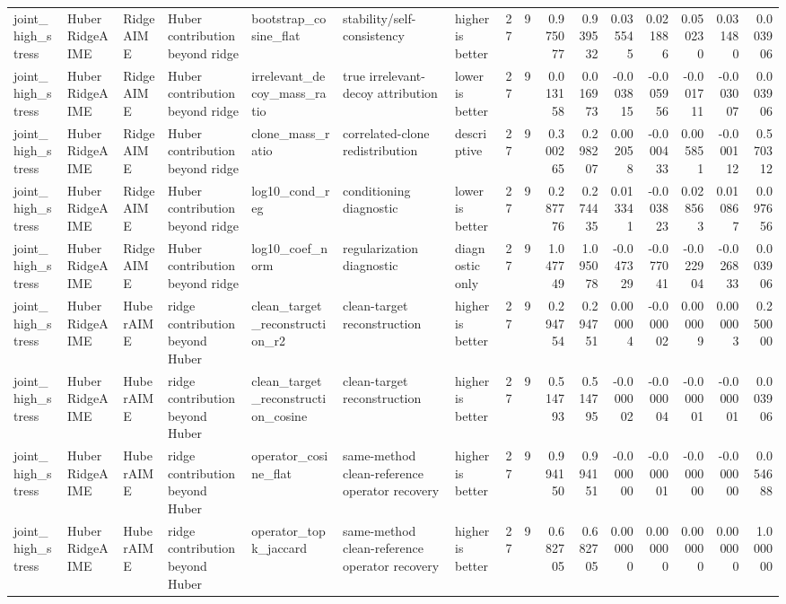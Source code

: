 \begin{table}[t]
\begin{tabular}{lllllllrrrrrrrrr}
joint_high_stress & HuberRidgeAIME & RidgeAIME & Huber contribution beyond ridge & bootstrap_cosine_flat & stability/self-consistency & higher is better & 27 & 9 & 0.975077 & 0.939532 & 0.035545 & 0.021886 & 0.050230 & 0.031480 & 0.003906 \\
joint_high_stress & HuberRidgeAIME & RidgeAIME & Huber contribution beyond ridge & irrelevant_decoy_mass_ratio & true irrelevant-decoy attribution & lower is better & 27 & 9 & 0.013158 & 0.016973 & -0.003815 & -0.005956 & -0.001711 & -0.003007 & 0.003906 \\
joint_high_stress & HuberRidgeAIME & RidgeAIME & Huber contribution beyond ridge & clone_mass_ratio & correlated-clone redistribution & descriptive & 27 & 9 & 0.300265 & 0.298207 & 0.002058 & -0.000433 & 0.005851 & -0.000112 & 0.570312 \\
joint_high_stress & HuberRidgeAIME & RidgeAIME & Huber contribution beyond ridge & log10_cond_reg & conditioning diagnostic & lower is better & 27 & 9 & 0.287776 & 0.274435 & 0.013341 & -0.003823 & 0.028563 & 0.010867 & 0.097656 \\
joint_high_stress & HuberRidgeAIME & RidgeAIME & Huber contribution beyond ridge & log10_coef_norm & regularization diagnostic & diagnostic only & 27 & 9 & 1.047749 & 1.095078 & -0.047329 & -0.077041 & -0.022904 & -0.026833 & 0.003906 \\
joint_high_stress & HuberRidgeAIME & HuberAIME & ridge contribution beyond Huber & clean_target_reconstruction_r2 & clean-target reconstruction & higher is better & 27 & 9 & 0.294754 & 0.294751 & 0.000004 & -0.000002 & 0.000009 & 0.000003 & 0.250000 \\
joint_high_stress & HuberRidgeAIME & HuberAIME & ridge contribution beyond Huber & clean_target_reconstruction_cosine & clean-target reconstruction & higher is better & 27 & 9 & 0.514793 & 0.514795 & -0.000002 & -0.000004 & -0.000001 & -0.000001 & 0.003906 \\
joint_high_stress & HuberRidgeAIME & HuberAIME & ridge contribution beyond Huber & operator_cosine_flat & same-method clean-reference operator recovery & higher is better & 27 & 9 & 0.994150 & 0.994151 & -0.000000 & -0.000001 & -0.000000 & -0.000000 & 0.054688 \\
joint_high_stress & HuberRidgeAIME & HuberAIME & ridge contribution beyond Huber & operator_topk_jaccard & same-method clean-reference operator recovery & higher is better & 27 & 9 & 0.682705 & 0.682705 & 0.000000 & 0.000000 & 0.000000 & 0.000000 & 1.000000 \\

\end{tabular}
\end{table}

